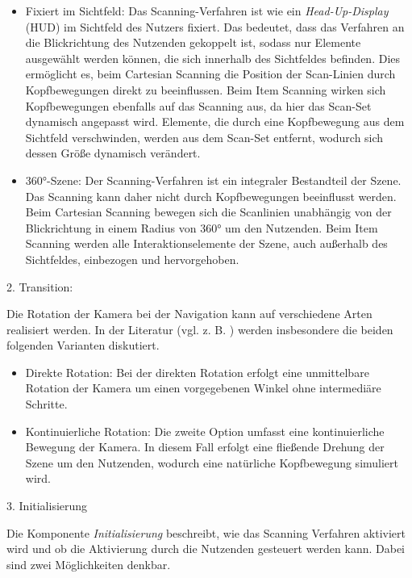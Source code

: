 \begin{itemize}
    \item Fixiert im Sichtfeld: Das Scanning-Verfahren ist wie ein \textit{Head-Up-Display} (HUD) im Sichtfeld des Nutzers fixiert. Das bedeutet, dass das Verfahren an die Blickrichtung des Nutzenden gekoppelt ist, sodass nur Elemente ausgewählt werden können, die sich innerhalb des Sichtfeldes befinden. Dies ermöglicht es, beim Cartesian Scanning die Position der Scan-Linien durch Kopfbewegungen direkt zu beeinflussen. Beim Item Scanning wirken sich Kopfbewegungen ebenfalls auf das Scanning aus, da hier das Scan-Set dynamisch angepasst wird. Elemente, die durch eine Kopfbewegung aus dem Sichtfeld verschwinden, werden aus dem Scan-Set entfernt, wodurch sich dessen Größe dynamisch verändert.
    \item 360°-Szene: Der Scanning-Verfahren ist ein integraler Bestandteil der Szene. Das Scanning kann daher nicht durch Kopfbewegungen beeinflusst werden. Beim Cartesian Scanning bewegen sich die Scanlinien unabhängig von der Blickrichtung in einem Radius von 360° um den Nutzenden. Beim Item Scanning werden alle Interaktionselemente der Szene, auch außerhalb des Sichtfeldes, einbezogen und hervorgehoben. 
\end{itemize}

2. Transition: 

Die Rotation der Kamera bei der Navigation kann auf verschiedene Arten realisiert werden. In der Literatur (vgl. z. B. \citet{10.1145/3441852.3471230, 10.1007/s10055-020-00425-x, 8797722}) werden insbesondere die beiden folgenden Varianten diskutiert.

\begin{itemize}
    \item Direkte Rotation: Bei der direkten Rotation erfolgt eine unmittelbare Rotation der Kamera um einen vorgegebenen Winkel ohne intermediäre Schritte. 
    \item Kontinuierliche Rotation: Die zweite Option umfasst eine kontinuierliche Bewegung der Kamera. In diesem Fall erfolgt eine fließende Drehung der Szene um den Nutzenden, wodurch eine natürliche Kopfbewegung simuliert wird. 
\end{itemize}

3. Initialisierung 

Die Komponente \textit{Initialisierung} beschreibt, wie das Scanning Verfahren aktiviert wird und ob die Aktivierung durch die Nutzenden gesteuert werden kann. Dabei sind zwei Möglichkeiten denkbar. 

